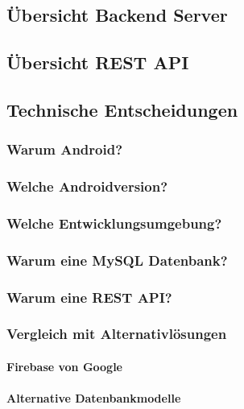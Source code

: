 \documentclass{scrartcl}
\begin{document}
\subsection{Übersicht Backend Server}

\subsection{Übersicht REST API}

\subsection{Technische Entscheidungen}

\subsubsection{Warum Android?}

\subsubsection{Welche Androidversion?}

\subsubsection{Welche Entwicklungsumgebung?}

\subsubsection{Warum eine MySQL Datenbank?}

\subsubsection{Warum eine REST API?}

\subsubsection{Vergleich mit Alternativlösungen}

\paragraph{Firebase von Google}

\paragraph{Alternative Datenbankmodelle}
\end{document}

